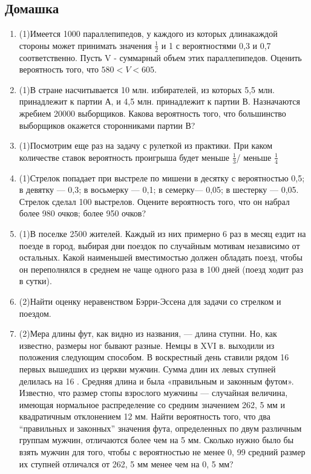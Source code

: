 \documentclass[a4paper, 14pt]{extarticle}
\begin{document}
\subsection*{Домашка}
\begin{enumerate}
\item (1)Имеется 1000 параллепипедов, у каждого из которых длинакаждой стороны может принимать значения
$\frac{1}{2}$ и 1 с вероятностями 0,3 и 0,7 соответственно. Пусть V - суммарный объем этих параллепипедов. 
Оценить вероятность того, что $580< V <605$.
\item (1)В стране насчитывается 10 млн. избирателей, из которых 5,5
млн. принадлежит к партии А, и 4,5 млн. принадлежит к партии В.
Назначаются жребием 20000 выборщиков. Какова вероятность того, что
большинство выборщиков окажется сторонниками партии В?
\item (1)Посмотрим еще раз на задачу с рулеткой из практики. При каком количестве ставок вероятность проигрыша будет меньше $\frac{1}{3}$/ меньше $\frac{1}{4}$
\item (1)Стрелок попадает при выстреле по мишени в десятку с вероятностью 0,5; в девятку —
0,3; в восьмерку — 0,1; в семерку— 0,05; в шестерку — 0,05. Стрелок сделал 100 выстрелов. Оцените
вероятность того, что он набрал более 980 очков; более 950 очков?
\item (1)В поселке 2500 жителей. Каждый из них примерно 6 раз в
месяц ездит на поезде в город, выбирая дни поездок по случайным мотивам независимо от остальных. 
Какой наименьшей вместимостью должен обладать поезд, чтобы он переполнялся в среднем не чаще одного
раза в 100 дней (поезд ходит раз в сутки).
\item (2)Найти оценку неравенством Бэрри-Эссена для задачи со стрелком и поездом.
\item (2)Мера длины фут, как видно из названия, — длина ступни. Но, как известно, размеры ног
бывают разные. Немцы в XVI в. выходили из положения следующим способом. В воскрестный день
ставили рядом 16 первых вышедших из церкви мужчин. Сумма длин их левых ступней делилась на
16 . Средняя длина и была «правильным и законным футом». Известно, что размер стопы взрослого
мужчины — случайная величина, имеющая нормальное распределение со средним значением 262, 5
мм и квадратичным отклонением 12 мм. Найти вероятность того, что два “правильных и законных”
значения фута, определенных по двум различным группам мужчин, отличаются более чем на 5 мм.
Сколько нужно было бы взять мужчин для того, чтобы с вероятностью не менее 0, 99 средний размер
их ступней отличался от 262, 5 мм менее чем на 0, 5 мм?

\end{enumerate}
\end{document}
